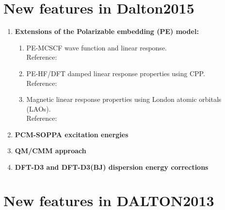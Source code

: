 \section{New features in Dalton2015}

\begin{enumerate}
\item{\bf Extensions of the Polarizable embedding (PE) model:}
\begin{enumerate}
 \item{PE-MCSCF wave function and linear response.} \\
  Reference:  \cite{pemcscf}
 \item{PE-HF/DFT damped linear response properties using CPP.} \\
  Reference:  \cite{pecpp}
 \item{Magnetic linear response properties using London atomic orbitals (LAOs).} \\
  Reference:  \cite{pelao}
\end{enumerate}
\item{\bf PCM-SOPPA excitation energies}
\item{\bf QM/CMM approach}
\item{\bf DFT-D3 and DFT-D3(BJ) dispersion energy corrections}
\end{enumerate}

\section{New features in DALTON2013}

